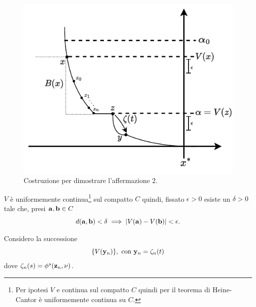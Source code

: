 \begin{steps}
    \hfill
    \begin{minipage}{.8\textwidth}
        \begin{figure}[H]
            \centering
            \includegraphics[width=.7\textwidth]{assets/ljapunov-dim-aff2}
            \caption[Costruzione 2 per teorema di Ljapunov]{Costruzione per dimostrare
            l'affermazione 2.}%
            \label{fig:ljapunov-dim-aff2}
        \end{figure}
    \end{minipage}

    $V$ è uniformemente continua\footnote{Per ipotesi
        $V$ e continua sul compatto $C$ quindi per il teorema di Heine-Cantor è
        uniformemente continua su $C$.} sul compatto $C$ quindi, fissato $\epsilon >0$ esiste un $\delta > 0$
    tale che, presi $\mathbf{a}, \mathbf{b} \in C$
    \begin{equation}
        d(\mathbf{a}, \mathbf{b}) < \delta \implies |V(\mathbf{a}) - V(\mathbf{b})| < \epsilon.
        \label{eq:v-uniformemente-continua}
    \end{equation}

    Considero la successione
    \begin{equation*}
        \{V(\mathbf{y}_n)\}, \text{ con } \mathbf{y}_n = \zeta_n(t)
    \end{equation*}
    dove $\zeta_n(s) = \phi^s(\mathbf{z}_n, \nu)$.


\end{steps}

